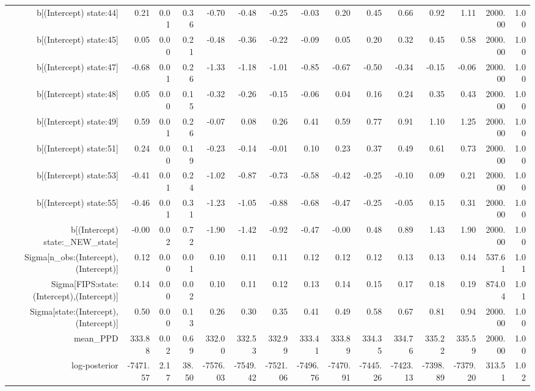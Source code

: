 \begin{table}[ht]
\begin{tabular}{rrrrrrrrrrrrrrr}
  b[(Intercept) state:44] & 0.21 & 0.01 & 0.36 & -0.70 & -0.48 & -0.25 & -0.03 & 0.20 & 0.45 & 0.66 & 0.92 & 1.11 & 2000.00 & 1.00 \\ 
  b[(Intercept) state:45] & 0.05 & 0.00 & 0.21 & -0.48 & -0.36 & -0.22 & -0.09 & 0.05 & 0.20 & 0.32 & 0.45 & 0.58 & 2000.00 & 1.00 \\ 
  b[(Intercept) state:47] & -0.68 & 0.01 & 0.26 & -1.33 & -1.18 & -1.01 & -0.85 & -0.67 & -0.50 & -0.34 & -0.15 & -0.06 & 2000.00 & 1.00 \\ 
  b[(Intercept) state:48] & 0.05 & 0.00 & 0.15 & -0.32 & -0.26 & -0.15 & -0.06 & 0.04 & 0.16 & 0.24 & 0.35 & 0.43 & 2000.00 & 1.00 \\ 
  b[(Intercept) state:49] & 0.59 & 0.01 & 0.26 & -0.07 & 0.08 & 0.26 & 0.41 & 0.59 & 0.77 & 0.91 & 1.10 & 1.25 & 2000.00 & 1.00 \\ 
  b[(Intercept) state:51] & 0.24 & 0.00 & 0.19 & -0.23 & -0.14 & -0.01 & 0.10 & 0.23 & 0.37 & 0.49 & 0.61 & 0.73 & 2000.00 & 1.00 \\ 
  b[(Intercept) state:53] & -0.41 & 0.01 & 0.24 & -1.02 & -0.87 & -0.73 & -0.58 & -0.42 & -0.25 & -0.10 & 0.09 & 0.21 & 2000.00 & 1.00 \\ 
  b[(Intercept) state:55] & -0.46 & 0.01 & 0.31 & -1.23 & -1.05 & -0.88 & -0.68 & -0.47 & -0.25 & -0.05 & 0.15 & 0.31 & 2000.00 & 1.00 \\ 
  b[(Intercept) state:\_NEW\_state] & -0.00 & 0.02 & 0.72 & -1.90 & -1.42 & -0.92 & -0.47 & -0.00 & 0.48 & 0.89 & 1.43 & 1.90 & 2000.00 & 1.00 \\ 
  Sigma[n\_obs:(Intercept),(Intercept)] & 0.12 & 0.00 & 0.01 & 0.10 & 0.11 & 0.11 & 0.12 & 0.12 & 0.12 & 0.13 & 0.13 & 0.14 & 537.61 & 1.01 \\ 
  Sigma[FIPS:state:(Intercept),(Intercept)] & 0.14 & 0.00 & 0.02 & 0.10 & 0.11 & 0.12 & 0.13 & 0.14 & 0.15 & 0.17 & 0.18 & 0.19 & 874.04 & 1.01 \\ 
  Sigma[state:(Intercept),(Intercept)] & 0.50 & 0.00 & 0.13 & 0.26 & 0.30 & 0.35 & 0.41 & 0.49 & 0.58 & 0.67 & 0.81 & 0.94 & 2000.00 & 1.00 \\ 
  mean\_PPD & 333.88 & 0.02 & 0.69 & 332.00 & 332.53 & 332.99 & 333.41 & 333.89 & 334.35 & 334.76 & 335.22 & 335.59 & 2000.00 & 1.00 \\ 
  log-posterior & -7471.57 & 2.17 & 38.50 & -7576.03 & -7549.42 & -7521.06 & -7496.76 & -7470.91 & -7445.26 & -7423.13 & -7398.89 & -7379.20 & 313.51 & 1.02 \\ 
   \hline
\end{tabular}
\end{table}
